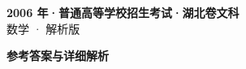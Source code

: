 \documentclass[zihao=-4, a4paper]{ctexart}
\begin{document}
\begin{center}
  {\Large\bfseries 2006 年·普通高等学校招生考试·湖北卷文科}\\[4pt]
  {\large 数学 · 解析版}
\end{center}
\medskip
{}

\clearpage
{}
\begin{center}{\Large\bfseries 参考答案与详细解析}\end{center}
\medskip

\end{document}
